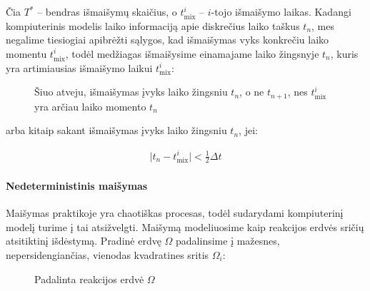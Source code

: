 Čia $T^*$ -- bendras išmaišymų skaičius, o $t^i_\text{mix}$ -- $i$-tojo išmaišymo laikas. Kadangi kompiuterinis modelis laiko informaciją apie diskrečius laiko taškus $t_n$, mes negalime tiesiogiai apibrėžti sąlygos, kad išmaišymas vyks konkrečiu laiko momentu $t^i_\text{mix}$, todėl medžiagas išmaišysime einamajame laiko žingsnyje $t_n$, kuris yra artimiausias išmaišymo laikui $t^i_\text{mix}$:

\begin{figure}[!h]
\centering
\caption{Šiuo atveju, išmaišymas įvyks laiko žingsniu $t_n$, o ne $t_{n+1}$, nes $t^i_\text{mix}$ yra arčiau laiko momento $t_n$}
\label{mix-inequality-graphic}
\end{figure}

arba kitaip sakant išmaišymas įvyks laiko žingsniu $t_n$, jei:

\begin{align}
    \vert t_n - t^i_\text{mix} \vert < \frac{1}{2}\Delta t \label{mix-inequality}
\end{align}

\paragraph{Nedeterministinis maišymas}

Maišymas praktikoje yra chaotiškas procesas, todėl sudarydami kompiuterinį modelį turime į tai atsižvelgti. Maišymą modeliuosime kaip reakcijos erdvės sričių atsitiktinį išdėstymą. Pradinė erdvę $\Omega$ padalinsime į mažesnes, nepersidengiančias, vienodas kvadratines sritis $\Omega_i$:

\begin{figure}[!h]
\centering
\caption{Padalinta reakcijos erdvė $\Omega$}
\label{mix-inequality-graphic}
\end{figure}

